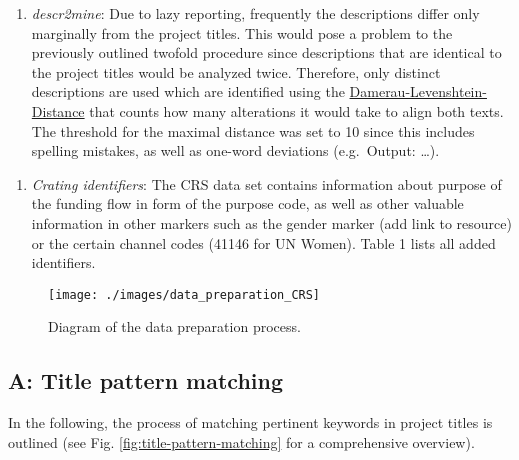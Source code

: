 \documentclass[
]{article}
\providecommand{\tightlist}{%
  \setlength{\itemsep}{0pt}\setlength{\parskip}{0pt}}
\begin{document}
\begin{enumerate}
  \begin{enumerate}
  \def\labelenumii{\roman{enumii}.}
  \setcounter{enumii}{2}
  \tightlist
  \item
    \emph{descr2mine}: Due to lazy reporting, frequently the descriptions differ only marginally from the project titles. This would pose a problem to the previously outlined twofold procedure since descriptions that are identical to the project titles would be analyzed twice. Therefore, only distinct descriptions are used which are identified using the \href{https://en.wikipedia.org/wiki/Damerau\%E2\%80\%93Levenshtein_distance}{Damerau-Levenshtein-Distance} that counts how many alterations it would take to align both texts. The threshold for the maximal distance was set to 10 since this includes spelling mistakes, as well as one-word deviations (e.g.~Output: \ldots).
  \end{enumerate}

  \begin{enumerate}
  \def\labelenumii{\roman{enumii}.}
  \setcounter{enumii}{3}
  \tightlist
  \item
    \emph{Crating identifiers}: The CRS data set contains information about purpose of the funding flow in form of the purpose code, as well as other valuable information in other markers such as the gender marker (add link to resource) or the certain channel codes (41146 for UN Women). Table 1 lists all added identifiers.
  \end{enumerate}
\end{enumerate}

\begin{figure}

{\centering \texttt{[image: ./images/data\_preparation\_CRS]} 

}

\caption{Diagram of the data preparation process.}\label{fig:data-preparation-CRS}
\end{figure}

\hypertarget{a-title-pattern-matching}{%
\subsection{\texorpdfstring{\textbf{A}: Title pattern matching}{A: Title pattern matching}}\label{a-title-pattern-matching}}

In the following, the process of matching pertinent keywords in project titles is outlined (see Fig. \ref{fig:title-pattern-matching} for a comprehensive overview).
\end{document}
